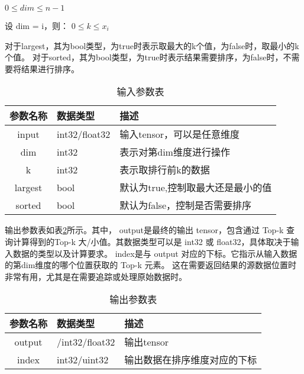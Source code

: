     \begin{center}
        $0 \leq dim \leq n - 1$
        
        设 dim = i，则： $0 \leq k \leq x_{i}$
    \end{center}
    对于largest，其为bool类型，为true时表示取最大的k个值，为false时，取最小的k个值。
    对于sorted，其为bool类型，为true时表示结果需要排序，为false时，不需要将结果进行排序。
    \begin{table}
        \centering
        \caption{输入参数表}
        \label{tab:input_tab}
        \begin{tabular}{cll} %
          \toprule
          参数名称   & 数据类型                                       & 描述                          \\
          \midrule
          input & int32/float32 & 输入tensor，可以是任意维度                      \\
          dim & int32   & 表示对第dim维度进行操作            \\
          k   & int32   & 表示取排行前k的数据              \\
          largest & bool   & 默认为true,控制取最大还是最小的值            \\
          sorted & bool   & 默认为false，控制是否需要排序            \\
          
          \bottomrule
        \end{tabular}
    \end{table}

    输出参数表如表\ref{tab:output_tab}所示。其中，
    output是最终的输出 tensor，包含通过 Top-k 查询计算得到的Top-k 大/小值。其数据类型可以是 int32 或 float32，具体取决于输入数据的类型以及计算要求。
    index是与 output 对应的下标。它指示从输入数据的第dim维度的哪个位置获取的 Top-k 元素。
    这在需要返回结果的源数据位置时非常有用，尤其是在需要追踪或处理原始数据时。
    \begin{table}
        \centering
        \caption{输出参数表}
        \label{tab:output_tab}
        \begin{tabular}{cll} %
          \toprule
          参数名称   & 数据类型                                       & 描述                          \\
          \midrule
          output & /int32/float32 & 输出tensor                 \\
          index   & int32/uint32   & 输出数据在排序维度对应的下标              \\
          \bottomrule
        \end{tabular}
    \end{table}
    

